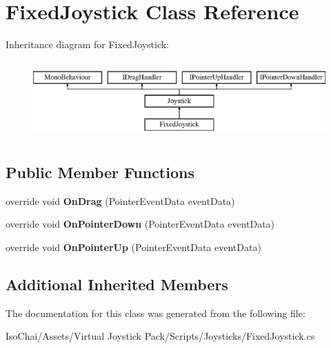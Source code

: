 \hypertarget{class_fixed_joystick}{}\section{Fixed\+Joystick Class Reference}
\label{class_fixed_joystick}
Inheritance diagram for Fixed\+Joystick\+:\begin{figure}[H]
\begin{center}
\leavevmode
\includegraphics[height=3.000000cm]{class_fixed_joystick}
\end{center}
\end{figure}
\subsection*{Public Member Functions}
\begin{DoxyCompactItemize}
\item 
\mbox{\label{class_fixed_joystick_a3608a6ae388b2718af9b91155d86eea5}} 
override void {\bfseries On\+Drag} (Pointer\+Event\+Data event\+Data)
\item 
\mbox{\label{class_fixed_joystick_a2e6be1323f094b36b40f820cc326c06f}} 
override void {\bfseries On\+Pointer\+Down} (Pointer\+Event\+Data event\+Data)
\item 
\mbox{\label{class_fixed_joystick_acebb0623f5935bf101b718aacb5b5ac3}} 
override void {\bfseries On\+Pointer\+Up} (Pointer\+Event\+Data event\+Data)
\end{DoxyCompactItemize}
\subsection*{Additional Inherited Members}


The documentation for this class was generated from the following file\+:\begin{DoxyCompactItemize}
\item 
Iso\+Chai/\+Assets/\+Virtual Joystick Pack/\+Scripts/\+Joysticks/Fixed\+Joystick.\+cs\end{DoxyCompactItemize}
